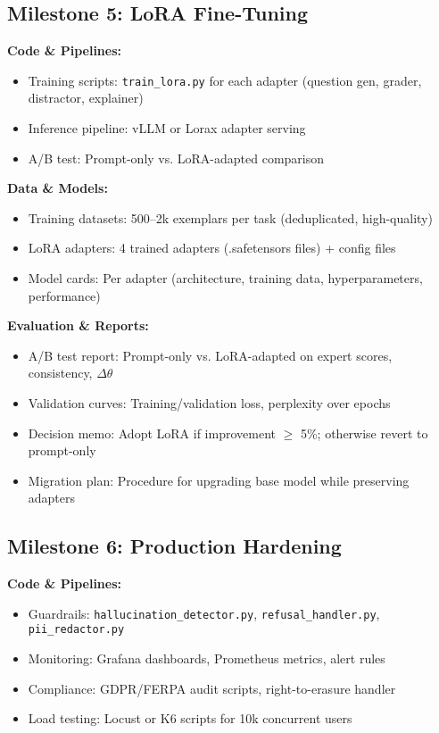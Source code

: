 \documentclass[11pt,letterpaper]{article}
\begin{document}
\subsection{Milestone 5: LoRA Fine-Tuning}

\textbf{Code \& Pipelines:}
\begin{itemize}
\item Training scripts: \texttt{train\_lora.py} for each adapter (question gen, grader, distractor, explainer)
\item Inference pipeline: vLLM or Lorax adapter serving
\item A/B test: Prompt-only vs. LoRA-adapted comparison
\end{itemize}

\textbf{Data \& Models:}
\begin{itemize}
\item Training datasets: 500--2k exemplars per task (deduplicated, high-quality)
\item LoRA adapters: 4 trained adapters (.safetensors files) + config files
\item Model cards: Per adapter (architecture, training data, hyperparameters, performance)
\end{itemize}

\textbf{Evaluation \& Reports:}
\begin{itemize}
\item A/B test report: Prompt-only vs. LoRA-adapted on expert scores, consistency, $\Delta\theta$
\item Validation curves: Training/validation loss, perplexity over epochs
\item Decision memo: Adopt LoRA if improvement $\geq$ 5\%; otherwise revert to prompt-only
\item Migration plan: Procedure for upgrading base model while preserving adapters
\end{itemize}

\subsection{Milestone 6: Production Hardening}

\textbf{Code \& Pipelines:}
\begin{itemize}
\item Guardrails: \texttt{hallucination\_detector.py}, \texttt{refusal\_handler.py}, \texttt{pii\_redactor.py}
\item Monitoring: Grafana dashboards, Prometheus metrics, alert rules
\item Compliance: GDPR/FERPA audit scripts, right-to-erasure handler
\item Load testing: Locust or K6 scripts for 10k concurrent users
\end{itemize}
\end{document}

